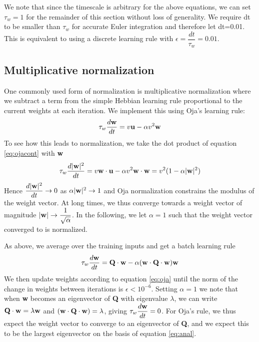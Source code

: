 \documentclass{article}
\begin{document}
We note that since the timescale is arbitrary for the above equations, we can set $\tau_w = 1$ for the remainder of this section without loss of generality. We require dt to be smaller than $\tau_w$ for accurate Euler integration and therefore let dt=0.01. This is equivalent to using a discrete learning rule with $\epsilon = \dfrac{dt}{\tau_w}=0.01$.

\subsection{Multiplicative normalization}

One commonly used form of normalization is multiplicative normalization where we subtract a term from the simple Hebbian learning rule proportional to the current weights at each iteration. We implement this using Oja's learning rule:
\begin{equation}\label{eq:ojacont}
\tau_w \dfrac{d\bf{w}}{dt} = v {\bf{u}} - \alpha v^2 {\bf{w}}
\end{equation}
To see how this leads to normalization, we take the dot product of equation \ref{eq:ojacont} with \textbf{w}
\begin{equation}
\tau_w \dfrac{d|{\bf{w}}|^2}{dt} = v {\bf{w} \cdot \bf{u}} - \alpha v^2 {\bf{w} \cdot \bf{w}} = v^2(1-\alpha |{\bf{w}}|^2)
\end{equation}
Hence $\dfrac{d|{\bf{w}}|^2}{dt} \rightarrow 0$ as $\alpha |{\bf{w}}|^2 \rightarrow 1$ and Oja normalization constrains the modulus of the weight vector. At long times, we thus converge towards a weight vector of magnitude $|{\bf{w}}| \rightarrow \dfrac{1}{\sqrt{\alpha}}$. In the following, we let $\alpha=1$ such that the weight vector converged to is normalized.

As above, we average over the training inputs and get a batch learning rule
\begin{equation}\label{eq:oja}
\tau_w \dfrac{d\bf{w}}{dt} = {\bf Q \cdot w} - \alpha ({\bf w \cdot Q \cdot w}) {\bf w}
\end{equation}
We then update weights according to equation \ref{eq:oja} until the norm of the change in weights between iterations is $\epsilon < 10^{-6}$. Setting $\alpha=1$ we note that when \textbf{w} becomes an eigenvector of \textbf{Q} with eigenvalue $\lambda$, we can write ${\bf Q \cdot w} = \lambda \bf w$ and $({\bf w \cdot Q \cdot w}) = \lambda$, giving  $\tau_w \dfrac{d\bf{w}}{dt} =0$. For Oja's rule, we thus expect the weight vector to converge to an eigenvector of \textbf{Q}, and we expect this to be the largest eigenvector on the basis of equation \ref{eq:anal}.
\end{document}
